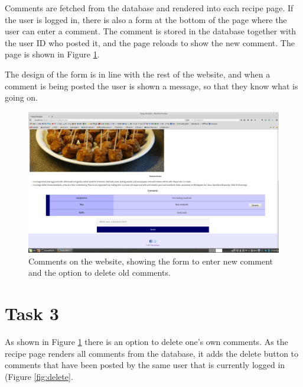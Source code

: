 \documentclass[a4paper]{scrreprt}
\begin{document}
Comments are fetched from the database and rendered into each recipe page. If the user is logged in, there is also a form at the bottom of the page where the user can enter a comment. The comment is stored in the database together with the user ID who posted it, and the page reloads to show the new comment. The page is shown in Figure \ref{fig:comments}.

The design of the form is in line with the rest of the website, and when a comment is being posted the user is shown a message, so that they know what is going on.

\begin{figure}[h!]
  \begin{center}
    \includegraphics[scale=0.41]{img/comments.png}
    \caption{Comments on the website, showing the form to enter new comment and the option to delete old comments.}
    \label{fig:comments}
  \end{center}
\end{figure}

\section{Task 3}

As shown in Figure \ref{fig:comments} there is an option to delete one's own comments. As the recipe page renders all comments from the database, it adds the delete button to comments that have been posted by the same user that is currently logged in (Figure \ref{fig:delete}.
\end{document}
